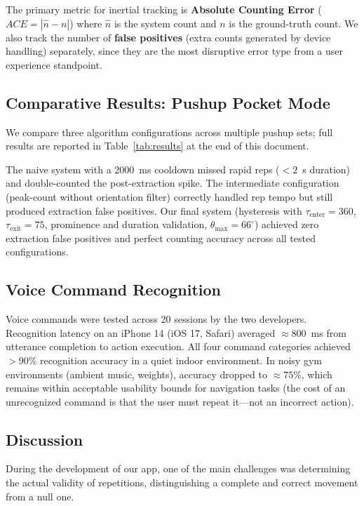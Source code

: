 \documentclass[11pt]{article}
\begin{document}
The primary metric for inertial tracking is \textbf{Absolute Counting Error} ($ACE = |\hat{n} - n|$) where $\hat{n}$ is the system count and $n$ is the ground-truth count. We also track the number of \textbf{false positives} (extra counts generated by device handling) separately, since they are the most disruptive error type from a user experience standpoint.

\subsection{Comparative Results: Pushup Pocket Mode}
\label{sec:results}

We compare three algorithm configurations across multiple pushup sets; full results are reported in Table~\ref{tab:results} at the end of this document.

The naive system with a 2000~ms cooldown missed rapid reps ($< 2$~s duration) and double-counted the post-extraction spike. The intermediate configuration (peak-count without orientation filter) correctly handled rep tempo but still produced extraction false positives. Our final system (hysteresis with $\tau_{\text{enter}} = 360$, $\tau_{\text{exit}} = 75$, prominence and duration validation, $\theta_{\text{max}} = 66^{\circ}$) achieved zero extraction false positives and perfect counting accuracy across all tested configurations.

\subsection{Voice Command Recognition}

Voice commands were tested across 20 sessions by the two developers. Recognition latency on an iPhone 14 (iOS 17, Safari) averaged $\approx 800$~ms from utterance completion to action execution. All four command categories achieved $> 90\%$ recognition accuracy in a quiet indoor environment. In noisy gym environments (ambient music, weights), accuracy dropped to $\approx 75\%$, which remains within acceptable usability bounds for navigation tasks (the cost of an unrecognized command is that the user must repeat it—not an incorrect action).

\subsection{Discussion}

During the development of our app, one of the main challenges was determining the actual validity of repetitions, distinguishing a complete and correct movement from a null one.
\end{document}
